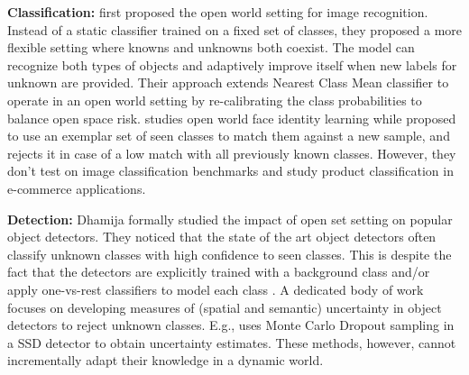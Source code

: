 \documentclass[final]{cvpr}
\begin{document}
\noindent\textbf{\OW Classification:} \cite{bendale2015towards} first proposed the open world setting for image recognition. Instead of a static classifier trained on a fixed set of classes, they proposed a more flexible setting where knowns and unknowns both coexist. The model can recognize both types of objects and adaptively improve itself when new labels for unknown are provided. Their approach extends Nearest Class Mean classifier to operate in an open world setting by re-calibrating the class probabilities to balance open space risk. \cite{pernici2018memory} studies open world face identity learning while \cite{xu2019open} proposed to use an exemplar set of seen classes to match them against a new sample, and rejects it in case of a low match with all previously known classes. 
However, they don’t test on image classification benchmarks and study product classification in e-commerce applications.

\noindent\textbf{\OS Detection:} Dhamija \etal \cite{dhamija2020overlooked} formally studied the impact of open set setting on popular object detectors. They noticed that the state of the art object detectors often classify unknown classes with high confidence to seen classes. This is despite the fact that the detectors are explicitly trained with a background class \cite{ren2016faster, girshick2015fast, liu2016ssd} and/or apply one-vs-rest classifiers to model each  class \cite{girshick2014rich, lin2017focal}. A dedicated body of work \cite{miller2018dropout, miller2019evaluating, hall2020probabilistic} focuses on developing measures of (spatial and semantic) uncertainty in object detectors to reject unknown classes. E.g., \cite{miller2018dropout,miller2019evaluating}  uses Monte Carlo Dropout \cite{gal2016dropout} sampling in a SSD detector to obtain uncertainty estimates. These methods, however, cannot incrementally adapt their knowledge in a dynamic world.








\section{\OWOD}\label{sec:prob_definition}
\end{document}
